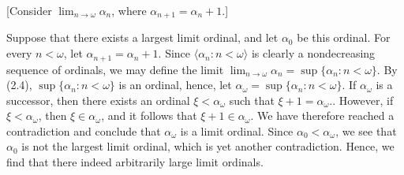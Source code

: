 [Consider $\lim_{n \rightarrow \omega} \alpha_n$, where 
$\alpha_{n+1} = \alpha_n + 1$.]
\begin{solution}
Suppose that there exists a largest limit ordinal, and let $\alpha_0$ be this 
ordinal. For every $n < \omega$, let $\alpha_{n+1} = \alpha_n + 1$. Since 
$\langle \alpha_n : n < \omega \rangle$ is clearly a nondecreasing sequence of 
ordinals, we may define the limit 
$\lim_{n \rightarrow \omega} \alpha_n = \sup \{ \alpha_n : n < \omega \}$. By 
(2.4), $\sup \{ \alpha_n : n < \omega \}$ is an ordinal, hence, let 
$\alpha_{\omega} = \sup \{ \alpha_n : n < \omega \}$. If $\alpha_{\omega}$ is 
a successor, then there exists an ordinal $\xi < \alpha_{\omega}$ such that 
$\xi + 1 = \alpha_{\omega}$.. However, if $\xi < \alpha_{\omega}$, then 
$\xi \in \alpha_{\omega}$, and it follows that $\xi + 1 \in \alpha_{\omega}$. 
We have therefore reached a contradiction and conclude that $\alpha_{\omega}$ 
is a limit ordinal. Since $\alpha_0 < \alpha_{\omega}$, we see that $\alpha_0$ 
is not the largest limit ordinal, which is yet another contradiction. Hence, we
find that there indeed arbitrarily large limit ordinals.
\end{solution}